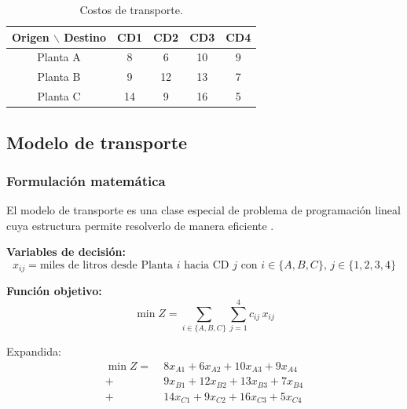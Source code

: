 \documentclass[12pt,a4paper]{article}
\begin{document}
\begin{table}[H]
  \centering
  \begin{tabular}{|c|cccc|}
    \hline
    \textbf{Origen $\backslash$ Destino} & \textbf{CD1} & \textbf{CD2} & \textbf{CD3} & \textbf{CD4} \\
    \hline
    Planta A & 8  & 6 & 10 & 9 \\
    Planta B & 9  & 12 & 13 & 7\\
    Planta C & 14 & 9  & 16 & 5 \\
    \hline
  \end{tabular}
  \caption{Costos de transporte.}
\end{table}

\subsection{Modelo de transporte}

\subsubsection{Formulaci\'{o}n matem\'{a}tica}

El modelo de transporte es una clase especial de problema de programaci\'{o}n lineal 
cuya estructura permite resolverlo de manera eficiente \cite{taha2012,hillier2015}.

\noindent\textbf{Variables de decisi\'{o}n:}
\[
  x_{ij} = \text{miles de litros desde Planta } i \text{ hacia CD } j
  \text{ con } i \in \{A,B,C\}, \, j \in \{1,2,3,4\}
\]

\noindent\textbf{Funci\'{o}n objetivo:}
\begin{equation}
  \min Z = \sum_{i \in \{A,B,C\}} \sum_{j=1}^{4} c_{ij}\, x_{ij}
\end{equation}

Expandida:
\begin{align*}
  \min Z = \; & 8x_{A1} + 6x_{A2} + 10x_{A3} + 9x_{A4} \\
             + \; & 9x_{B1} + 12x_{B2} + 13x_{B3} + 7x_{B4} \\
             + \; & 14x_{C1} + 9x_{C2} + 16x_{C3} + 5x_{C4}
\end{align*}
\end{document}
